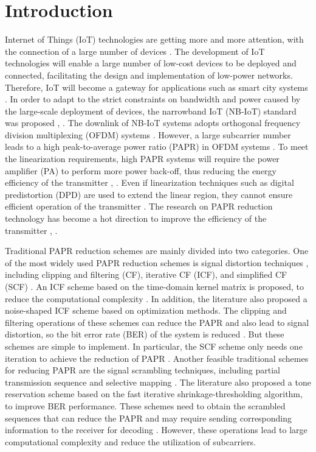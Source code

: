 \documentclass[journal]{IEEEtran}
\begin{document}
\section{Introduction}
Internet of Things (IoT) technologies are getting more and more attention, with the connection of a large number of devices \cite{b1}\cite{b2}\cite{b3}. The development of IoT technologies will enable a large number of low-cost devices to be deployed and connected, facilitating the design and implementation of low-power networks. Therefore, IoT will become a gateway for applications such as smart city systems \cite{b4}. In order to adapt to the strict constraints on bandwidth and power caused by the large-scale deployment of devices, the narrowband IoT (NB-IoT) standard was proposed \cite{b4}, \cite{b5}. The downlink of NB-IoT systems adopts orthogonal frequency division multiplexing (OFDM) systems \cite{b6}. However, a large subcarrier number leads to a high peak-to-average power ratio (PAPR) in OFDM systems \cite{b7}. To meet the linearization requirements, high PAPR systems will require the power amplifier (PA) to perform more power back-off, thus reducing the energy efficiency of the transmitter \cite{b8}, \cite{b9}. Even if linearization techniques such as digital predistortion (DPD) are used to extend the linear region, they cannot ensure efficient operation of the transmitter \cite{b10}. The research on PAPR reduction technology has become a hot direction to improve the efficiency of the transmitter \cite{b11}, \cite{b12}.

Traditional PAPR reduction schemes are mainly divided into two categories. One of the most widely used PAPR reduction schemes is signal distortion techniques \cite{b12}, including clipping and filtering (CF), iterative CF (ICF), and simplified CF (SCF) \cite{b13}. An ICF scheme based on the time-domain kernel matrix is proposed, to reduce the computational complexity \cite{b14}. In addition, the literature \cite{b15} also proposed a noise-shaped ICF scheme based on optimization methods. The clipping and filtering operations of these schemes can reduce the PAPR and also lead to signal distortion, so the bit error rate (BER) of the system is reduced \cite{b8}. But these schemes are simple to implement. In particular, the SCF scheme only needs one iteration to achieve the reduction of PAPR \cite{b13}. Another feasible traditional schemes for reducing PAPR are the signal scrambling techniques, including partial transmission sequence and selective mapping \cite{b16}. The literature \cite{b17} also proposed a tone reservation scheme based on the fast iterative shrinkage-thresholding algorithm, to improve BER performance. These schemes need to obtain the scrambled sequences that can reduce the PAPR and may require sending corresponding information to the receiver for decoding \cite{b16}. However, these operations lead to large computational complexity \cite{b11} and reduce the utilization of subcarriers.
\end{document}
